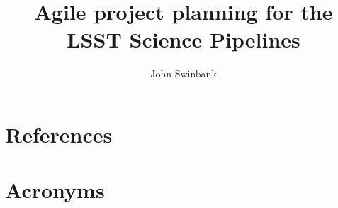 \documentclass[DM,authoryear,toc]{lsstdoc}
\title{Agile project planning for the LSST Science Pipelines}
\author{%
John Swinbank
}
\date{\vcsDate}
\begin{document}
\maketitle


\appendix
\section{References} \label{sec:bib}


\section{Acronyms} \label{sec:acronyms}

\end{document}
